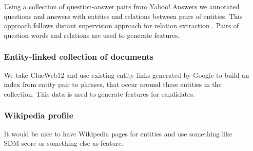 Using a collection of question-answer pairs from Yahoo! Answers we annotated questions and answers with entities and relations between pairs of entities.
This approach follows distant supervision approach for relation extraction \cite{savenkov-EtAl:2015:SRW}.
Pairs of question words and relations are used to generate features.

\subsubsection{Entity-linked collection of documents}
We take ClueWeb12 and use existing entity links generated by Google to build an index from entity pair to phrases, that occur around these entities in the collection.
This data is used to generate features for candidates.

\subsubsection{Wikipedia profile}
It would be nice to have Wikipedia pages for entities and use something like SDM score or something else as feature.